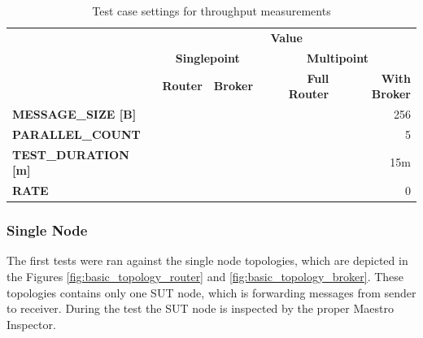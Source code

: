 \begingroup
\setlength{\tabcolsep}{10pt} %
\renewcommand{\arraystretch}{1.35} %
	\begin{table}[H]
	\centering
	\caption{Test case settings for throughput measurements}
	\label{tab:test_case_throughput}
	\begin{tabular}{|l|r|r|r|r|}
	\hline
	\rowcolor[HTML]{C5E3DF}
	\cellcolor[HTML]{C5E3DF}                                         & \multicolumn{4}{c|}{\cellcolor[HTML]{C5E3DF}\textbf{Value}}                                                                          \\ \cline{2-5}
	\rowcolor[HTML]{C5E3DF}
	\cellcolor[HTML]{C5E3DF}                                         & \multicolumn{2}{c|}{\cellcolor[HTML]{C5E3DF}\textbf{Singlepoint}} & \multicolumn{2}{c|}{\cellcolor[HTML]{C5E3DF}\textbf{Multipoint}} \\ \cline{2-5}
	\rowcolor[HTML]{C5E3DF}
	\multirow{-3}{*}{\cellcolor[HTML]{C5E3DF}\textbf{Test Property}} & \textbf{Router}                 & \textbf{Broker}                 & \textbf{Full Router}            & \textbf{With Broker}           \\ \hline
	\textbf{MESSAGE\_SIZE [B]}                          & \multicolumn{4}{r|}{256}                    \\ \hline
	\textbf{PARALLEL\_COUNT}                            & \multicolumn{4}{r|}{5}                      \\ \hline
	\textbf{TEST\_DURATION [m]}                         & \multicolumn{4}{r|}{15m}                    \\ \hline
	\textbf{RATE}                                       & \multicolumn{4}{r|}{0}                   		\\ \hline
	\end{tabular}
	\end{table}
\endgroup



\subsubsection*{Single Node}
The first tests were ran against the single node topologies, which are depicted in the Figures \ref{fig:basic_topology_router} and \ref{fig:basic_topology_broker}. These topologies contains only one SUT node, which is forwarding messages from sender to receiver. During the test the SUT node is inspected by the proper Maestro Inspector.

